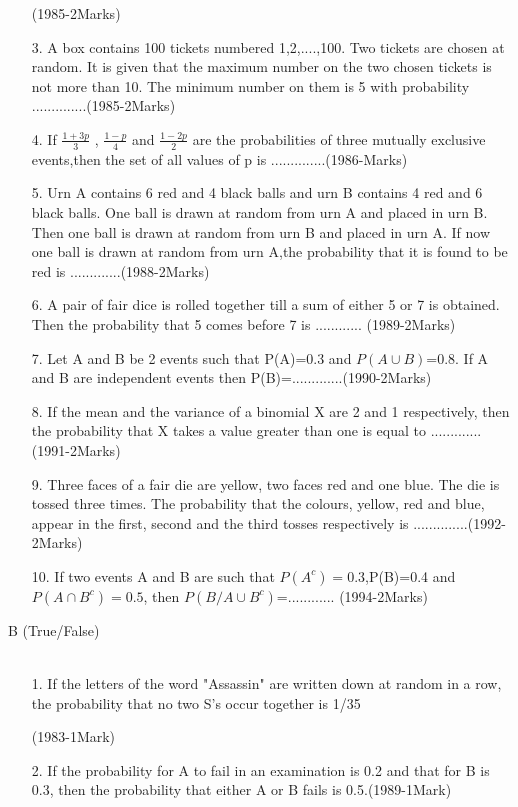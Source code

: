 \documentclass[journal,12pt,twocolumn]{IEEEtran}
\theoremstyle{remark}
\begin{document}
\begin{enumerate}
    \hfill{(1985-2Marks)}\\
    \item[3.] A box contains 100 tickets numbered 1,2,....,100. Two tickets are chosen at random. It is given that the maximum number on the two chosen tickets is not more than 10. The minimum number on them is 5 with probability ..............\hfill{(1985-2Marks)}\\
    \item[4.] If $\frac{1+3p}{3}$ , $\frac{1-p}{4}$ and $\frac{1-2p}{2}$ are the probabilities of three mutually exclusive events,then the set of all values of p is ..............\hfill{(1986-Marks)}\\
    \item[5.] Urn A contains 6 red and 4 black balls and urn B contains 4 red and 6 black balls. One ball is drawn at random from urn A and placed in urn B. Then one ball is drawn at random from urn B and placed in urn A. If now one ball is drawn at random from urn A,the probability that it is found to be red is .............\hfill{(1988-2Marks)}\\
    \item[6.] A pair of fair dice is rolled together till a sum of either 5 or 7 is obtained. Then the probability that 5 comes before 7 is 
    ............
    \hfill{(1989-2Marks)}\\
    \item[7.] Let A and B be 2 events such that P(A)=0.3 and $P(A \cup B)$=0.8. If A and B are independent events then P(B)=.............\hfill{(1990-2Marks)}\\
    \item[8.] If the mean and the variance of a binomial X are 2 and 1 respectively, then the probability that X takes a value greater than one is equal to .............\hfill{(1991-2Marks)}\\ 
    \item[9.] Three faces of a fair die are yellow, two faces red and one blue. The die is tossed three times. The probability that the colours, yellow, red and blue, appear in the first, second and the third tosses  respectively is ..............\hfill{(1992-2Marks)}\\
    \item[10.] If two events A and B are such that $P(A^{c})=0.3$,P(B)=0.4 and $P(A \cap B^{c})=0.5$, then $P(B/A \cup B^{c})$=............ \hfill{(1994-2Marks)}
\end{enumerate}
B (True/False)\\\\
\begin{enumerate}
    \item[1.] If the letters of the word "Assassin" are written down at random in a row, the probability that no two S's occur together is 1/35
    
    \hfill{(1983-1Mark)}\\
    \item[2.] If the probability for A to fail in an examination is 0.2 and that for B is 0.3, then the probability that either A or B fails is 0.5.\hfill{(1989-1Mark)}
\end{enumerate}
\end{document}
